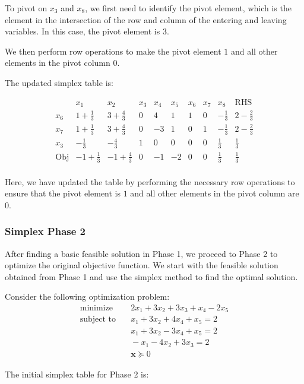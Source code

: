 To pivot on $x_3$ and $x_8$, we first need to identify the pivot element, which is the element in the intersection of the row and column of the entering and leaving variables. In this case, the pivot element is $3$.

We then perform row operations to make the pivot element $1$ and all other elements in the pivot column $0$.

The updated simplex table is:

\[ 
\begin{array}{c|cccccccc|c}
 & x_1 & x_2 & x_3 & x_4 & x_5 & x_6 & x_7 & x_8 & \text{RHS} \\ 
\hline
x_6 & 1 + \frac{1}{3} & 3 + \frac{4}{3} & 0 & 4 & 1 & 1 & 0 & -\frac{1}{3} & 2 - \frac{2}{3} \\ 
x_7 & 1 + \frac{1}{3} & 3 + \frac{4}{3} & 0 & -3 & 1 & 0 & 1 & -\frac{1}{3} & 2 - \frac{2}{3} \\ 
x_3 & -\frac{1}{3} & -\frac{4}{3} & 1 & 0 & 0 & 0 & 0 & \frac{1}{3} & \frac{1}{3} \\ 
\hline
\text{Obj} & -1 + \frac{1}{3} & -1 + \frac{4}{3} & 0 & -1 & -2 & 0 & 0 & \frac{1}{3} & \frac{1}{3} \\ 
\end{array}
\]

Here, we have updated the table by performing the necessary row operations to ensure that the pivot element is $1$ and all other elements in the pivot column are $0$.

\subsubsection{Simplex Phase 2}
After finding a basic feasible solution in Phase 1, we proceed to Phase 2 to optimize the original objective function. We start with the feasible solution obtained from Phase 1 and use the simplex method to find the optimal solution.

Consider the following optimization problem:
\begin{align}
  \text{minimize} & \quad 2 x_1 + 3 x_2 + 3 x_3 + x_4 - 2 x_5 \\
  \text{subject to} & \quad x_1 + 3x_2 + 4 x_4 + x_5 = 2 \\
  & \quad x_1 + 3x_2 - 3x_4 + x_5 = 2 \\
  & \quad - x_1 - 4 x_2 + 3x_3 = 2 \\
  & \quad \textbf{x} \succeq 0 
\end{align}

The initial simplex table for Phase 2 is:

